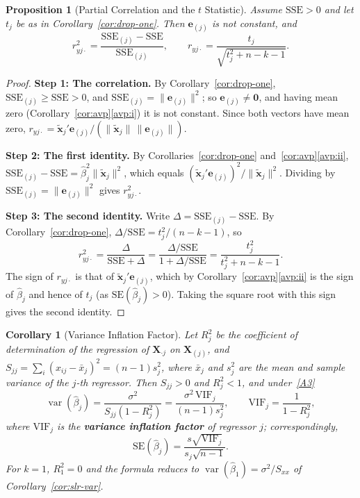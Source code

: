 \documentclass[14pt]{extarticle}
\theoremstyle{plain}
\newtheorem{corollary}[theorem]{Corollary}
\newtheorem{proposition}[theorem]{Proposition}
\theoremstyle{definition}
\theoremstyle{remark}
\DeclareMathOperator\var{var}
\newcommand{\SSE}{\mathrm{SSE}}
\newcommand{\SE}{\mathrm{SE}}
\newcommand{\bX}{\mathbf{X}}
\newcommand{\bx}{\mathbf{x}}
\newcommand{\bzero}{\mathbf{0}}
\newcommand{\VIF}{\mathrm{VIF}}
\begin{document}
\begin{proposition}[Partial Correlation and the $t$ Statistic]\label{prop:partial-t}
Assume $\SSE > 0$ and let $t_j$ be as in Corollary~\ref{cor:drop-one}. Then $\mathbf{e}_{(j)}$ is not constant, and
\[
r_{yj\cdot}^2 = \frac{\SSE_{(j)} - \SSE}{\SSE_{(j)}}, \qquad r_{yj\cdot} = \frac{t_j}{\sqrt{t_j^2 + n - k - 1}}.
\]
\end{proposition}

\begin{proof}
\textbf{Step 1: The correlation.} By Corollary~\ref{cor:drop-one}, $\SSE_{(j)} \geqslant \SSE > 0$, and $\SSE_{(j)} = \|\mathbf{e}_{(j)}\|^2$; so $\mathbf{e}_{(j)} \neq \bzero$, and having mean zero (Corollary~\ref{cor:avp}\ref{avp:i}) it is not constant. Since both vectors have mean zero, $r_{yj\cdot} = \tilde{\bx}_j'\mathbf{e}_{(j)}/(\|\tilde{\bx}_j\|\,\|\mathbf{e}_{(j)}\|)$.

\textbf{Step 2: The first identity.} By Corollaries~\ref{cor:drop-one} and~\ref{cor:avp}\ref{avp:ii}, $\SSE_{(j)} - \SSE = \hat\beta_j^2\|\tilde{\bx}_j\|^2$, which equals $(\tilde{\bx}_j'\mathbf{e}_{(j)})^2/\|\tilde{\bx}_j\|^2$. Dividing by $\SSE_{(j)} = \|\mathbf{e}_{(j)}\|^2$ gives $r_{yj\cdot}^2$.

\textbf{Step 3: The second identity.} Write $\Delta = \SSE_{(j)} - \SSE$. By Corollary~\ref{cor:drop-one}, $\Delta/\SSE = t_j^2/(n-k-1)$, so
\[
r_{yj\cdot}^2 = \frac{\Delta}{\SSE + \Delta} = \frac{\Delta/\SSE}{1 + \Delta/\SSE} = \frac{t_j^2}{t_j^2 + n - k - 1}.
\]
The sign of $r_{yj\cdot}$ is that of $\tilde{\bx}_j'\mathbf{e}_{(j)}$, which by Corollary~\ref{cor:avp}\ref{avp:ii} is the sign of $\hat\beta_j$ and hence of $t_j$ (as $\SE(\hat\beta_j) > 0$). Taking the square root with this sign gives the second identity.
\end{proof}

\begin{corollary}[Variance Inflation Factor]\label{cor:vif}
Let $R_j^2$ be the coefficient of determination of the regression of $\bX_{\cdot j}$ on $\bX_{(j)}$, and $S_{jj} = \sum_i(x_{ij} - \bar x_j)^2 = (n-1)s_j^2$, where $\bar x_j$ and $s_j^2$ are the mean and sample variance of the $j$-th regressor. Then $S_{jj} > 0$ and $R_j^2 < 1$, and under~\ref{A3}
\[
\var(\hat\beta_j) = \frac{\sigma^2}{S_{jj}(1 - R_j^2)} = \frac{\sigma^2\,\VIF_j}{(n-1)s_j^2}, \qquad \VIF_j = \frac{1}{1 - R_j^2},
\]
where $\VIF_j$ is the \textbf{variance inflation factor} of regressor $j$; correspondingly,
\[
\SE(\hat\beta_j) = \frac{s\sqrt{\VIF_j}}{s_j\sqrt{n-1}}.
\]
For $k = 1$, $R_1^2 = 0$ and the formula reduces to $\var(\hat\beta_1) = \sigma^2/S_{xx}$ of Corollary~\ref{cor:slr-var}.
\end{corollary}
\end{document}
